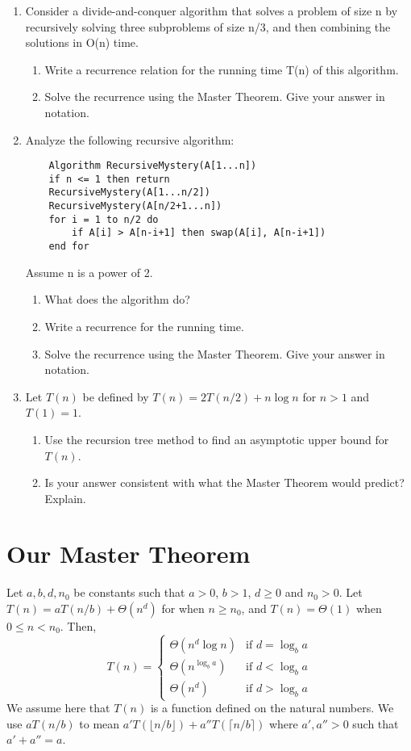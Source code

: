 \documentclass{article}
\begin{document}
\begin{enumerate}
    \item  Consider a divide-and-conquer algorithm that solves a problem of size n by recursively solving three subproblems of size n/3, and then combining the solutions in O(n) time.
    \begin{enumerate}
        \item Write a recurrence relation for the running time T(n) of this algorithm.
        \item Solve the recurrence using the Master Theorem.  Give your answer in \Theta notation.
    \end{enumerate}

    \item  Analyze the following recursive algorithm:
    \begin{verbatim}
    Algorithm RecursiveMystery(A[1...n])
    if n <= 1 then return
    RecursiveMystery(A[1...n/2])
    RecursiveMystery(A[n/2+1...n])
    for i = 1 to n/2 do
        if A[i] > A[n-i+1] then swap(A[i], A[n-i+1])
    end for
    \end{verbatim}
    Assume n is a power of 2.
    \begin{enumerate}
        \item What does the algorithm do?
        \item Write a recurrence for the running time.
        \item Solve the recurrence using the Master Theorem. Give your answer in \Theta notation.
    \end{enumerate}

    \item  Let $T(n)$ be defined by $T(n) = 2T(n/2) + n \log n$ for $n > 1$ and $T(1) = 1$.
    \begin{enumerate}
        \item  Use the recursion tree method to find an asymptotic upper bound for $T(n)$.
        \item  Is your answer consistent with what the Master Theorem would predict? Explain.
    \end{enumerate}


\end{enumerate}

\section*{Our Master Theorem}

\begin{theorem}
Let $a, b, d, n_0$ be constants such that $a > 0$, $b > 1$, $d \ge 0$ and $n_0 > 0$. Let $T(n) = aT(n/b) + \Theta(n^d)$ for when $n \ge n_0$, and $T(n) = \Theta(1)$ when $0 \le n < n_0$. Then,
\[
T(n) = \begin{cases}
\Theta(n^d \log n) & \text{if } d = \log_b a \\
\Theta(n^{\log_b a}) & \text{if } d < \log_b a \\
\Theta(n^d) & \text{if } d > \log_b a
\end{cases}
\]
We assume here that $T(n)$ is a function defined on the natural numbers. We use $aT(n/b)$ to mean $a'T(\lfloor n/b \rfloor) + a''T(\lceil n/b \rceil)$ where $a', a'' > 0$ such that $a' + a'' = a$.
\end{theorem}
\end{document}
